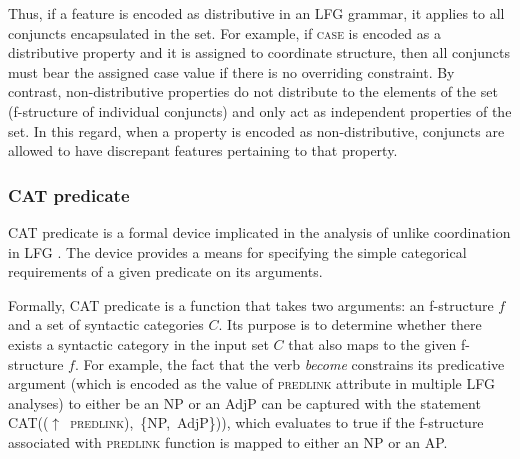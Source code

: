 Thus, if a feature is encoded as distributive in an LFG grammar, it applies to all conjuncts encapsulated in the set. For example, if \textsc{case} is encoded as a distributive property and it is assigned to coordinate structure, then all conjuncts must bear the assigned case value if there is no overriding constraint. By contrast, non-distributive properties do not distribute to the elements of the set (f-structure of individual conjuncts) and only act as independent properties of the set. In this regard, when a property is encoded as non-distributive, conjuncts are allowed to have discrepant features pertaining to that property. 

\subsubsection{CAT predicate}

CAT predicate is a formal device implicated in the analysis of unlike coordination in LFG \citep[see][]{DalrympleKaplan2000, Dalrymple2017}. The device provides a means for specifying the simple categorical requirements of a given predicate on its arguments.

\begin{sloppypar}
Formally, CAT predicate is a function that takes two arguments: an f-structure $f$ and a set of syntactic categories $C$. Its purpose is to determine whether there exists a syntactic category in the input set $C$ that also maps to the given f-structure $f$. For example, the fact that the verb \textit{become} constrains its predicative argument (which is encoded as the value of \textsc{predlink} attribute in multiple LFG analyses) to either be an NP or an AdjP can be captured with the statement \mbox{CAT(($\uparrow$ \textsc{predlink}), \{NP, AdjP\}))}, which evaluates to true if the f-structure associated with \textsc{predlink} function is mapped to either an  NP or an AP.
\end{sloppypar}